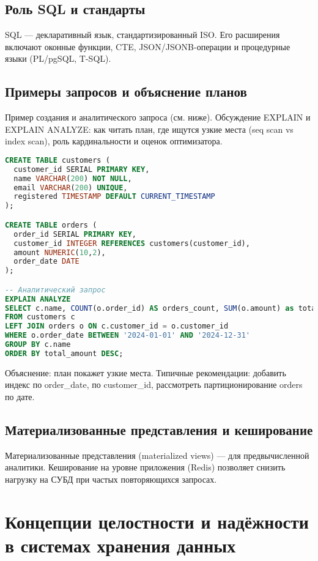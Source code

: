 \documentclass[14pt,a4paper]{extarticle}
\begin{document}
\subsection{Роль SQL и стандарты}
SQL — декларативный язык, стандартизированный ISO. Его расширения включают оконные функции, CTE, JSON/JSONB-операции и процедурные языки (PL/pgSQL, T-SQL).

\subsection{Примеры запросов и объяснение планов}

Пример создания и аналитического запроса (см. ниже). Обсуждение EXPLAIN и EXPLAIN ANALYZE: как читать план, где ищутся узкие места (seq scan vs index scan), роль кардинальности и оценок оптимизатора.

\begin{lstlisting}[language=SQL, caption={Пример создания схемы и аналитики}]
CREATE TABLE customers (
  customer_id SERIAL PRIMARY KEY,
  name VARCHAR(200) NOT NULL,
  email VARCHAR(200) UNIQUE,
  registered TIMESTAMP DEFAULT CURRENT_TIMESTAMP
);

CREATE TABLE orders (
  order_id SERIAL PRIMARY KEY,
  customer_id INTEGER REFERENCES customers(customer_id),
  amount NUMERIC(10,2),
  order_date DATE
);

-- Аналитический запрос
EXPLAIN ANALYZE
SELECT c.name, COUNT(o.order_id) AS orders_count, SUM(o.amount) as total_amount
FROM customers c
LEFT JOIN orders o ON c.customer_id = o.customer_id
WHERE o.order_date BETWEEN '2024-01-01' AND '2024-12-31'
GROUP BY c.name
ORDER BY total_amount DESC;
\end{lstlisting}

Объяснение: план покажет узкие места. Типичные рекомендации: добавить индекс по order\_date, по customer\_id, рассмотреть партиционирование orders по дате.

\subsection{Материализованные представления и кеширование}
Материализованные представления (materialized views) — для предвычисленной аналитики. Кеширование на уровне приложения (Redis) позволяет снизить нагрузку на СУБД при частых повторяющихся запросах.

\section{Концепции целостности и надёжности в системах хранения данных}
\end{document}
